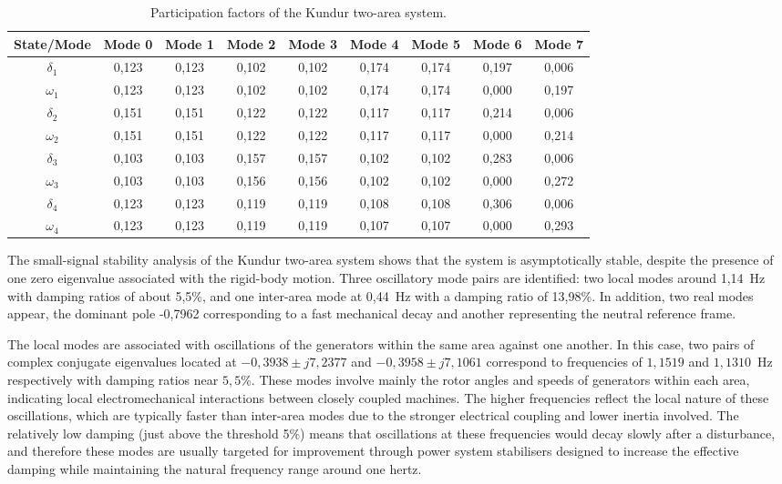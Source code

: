 \begin{table}[H]
\centering
\caption{Participation factors of the Kundur two-area system.}
\label{tab:pfactors_kundur}
\renewcommand{\arraystretch}{1.2}
\small
\begin{tabular}{|c|cccccccc|}
\hline
\textbf{State/Mode} & \textbf{Mode 0} & \textbf{Mode 1} & \textbf{Mode 2} & \textbf{Mode 3} & \textbf{Mode 4} & \textbf{Mode 5} & \textbf{Mode 6} & \textbf{Mode 7} \\ 
\hline
$\delta_1$ & 0,123 & 0,123 & 0,102 & 0,102 & 0,174 & 0,174 & 0,197 & 0,006 \\
$\omega_1$ & 0,123 & 0,123 & 0,102 & 0,102 & 0,174 & 0,174 & 0,000 & 0,197 \\
$\delta_2$ & 0,151 & 0,151 & 0,122 & 0,122 & 0,117 & 0,117 & 0,214 & 0,006 \\
$\omega_2$ & 0,151 & 0,151 & 0,122 & 0,122 & 0,117 & 0,117 & 0,000 & 0,214 \\
$\delta_3$ & 0,103 & 0,103 & 0,157 & 0,157 & 0,102 & 0,102 & 0,283 & 0,006 \\
$\omega_3$ & 0,103 & 0,103 & 0,156 & 0,156 & 0,102 & 0,102 & 0,000 & 0,272 \\
$\delta_4$ & 0,123 & 0,123 & 0,119 & 0,119 & 0,108 & 0,108 & 0,306 & 0,006 \\
$\omega_4$ & 0,123 & 0,123 & 0,119 & 0,119 & 0,107 & 0,107 & 0,000 & 0,293 \\
\hline
\end{tabular}
\end{table}



The small-signal stability analysis of the Kundur two-area system shows that the system is asymptotically stable, 
despite the presence of one zero eigenvalue associated with the rigid-body motion. Three oscillatory
mode pairs are identified: two local modes around 1,14~Hz with damping ratios of about 5,5\%, 
and one inter-area mode at 0,44~Hz with a damping ratio of 13,98\%. In addition, two real modes appear,
the dominant pole -0,7962 corresponding to a fast mechanical decay and another representing the neutral 
reference frame.

The local modes are associated with oscillations of the generators within the same area against one another. 
In this case, two pairs of complex conjugate eigenvalues located at $-0,3938 \pm j7,2377$ and $-0,3958 \pm j7,1061$ correspond to frequencies
 of $1,1519$ and $1,1310$~Hz respectively with damping ratios near $5,5\%$. These modes involve mainly the rotor angles and 
 speeds of generators within each area, indicating local electromechanical interactions between closely coupled machines. The higher frequencies reflect the local nature of these oscillations, which are typically faster than inter-area modes due to the stronger electrical coupling and lower inertia involved. 
 The relatively low damping (just above the threshold 5\%) means that oscillations at these frequencies would decay slowly after a 
 disturbance, and therefore these modes are usually targeted for improvement through power system stabilisers designed to increase 
 the effective damping while maintaining the natural frequency range around one hertz.

